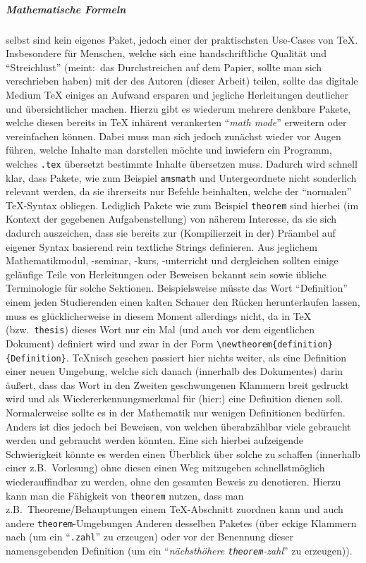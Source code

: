 \subparagraph*{Mathematische Formeln} selbst sind kein eigenes Paket, jedoch einer der praktischsten Use-Cases von \TeX{}. Insbesondere für Menschen, welche sich eine handschriftliche Qualität und \enquote{Streichlust} (meint:\ das Durchstreichen auf dem Papier, sollte man sich verschrieben haben) mit der des Autoren (dieser Arbeit) teilen, sollte das digitale Medium \TeX{} einiges an Aufwand ersparen und jegliche Herleitungen deutlicher und übersichtlicher machen. %
Hierzu gibt es wiederum mehrere denkbare Pakete, welche diesen bereits in \TeX{} inhärent verankerten \enquote{\textit{math mode}} erweitern oder vereinfachen können. Dabei muss man sich jedoch zunächst wieder vor Augen führen, welche Inhalte man darstellen möchte und inwiefern ein Programm, welches \texttt{.tex} übersetzt bestimmte Inhalte übersetzen muss. Dadurch wird schnell klar, dass Pakete, wie zum Beispiel \texttt{amsmath} und Untergeordnete nicht sonderlich relevant werden, da sie ihrerseits nur Befehle beinhalten, welche der \enquote{normalen} \TeX{}-Syntax obliegen. Lediglich Pakete wie zum Beispiel \texttt{theorem} sind hierbei (im Kontext der gegebenen Aufgabenstellung) von näherem Interesse, da sie sich dadurch auszeichen, dass sie bereits zur (Kompilierzeit in der) Präambel auf eigener Syntax basierend rein textliche Strings definieren. Aus jeglichem Mathematikmodul, -seminar, -kurs, -unterricht und dergleichen sollten einige geläufige Teile von Herleitungen oder Beweisen bekannt sein sowie übliche Terminologie für solche Sektionen. Beispielsweise müsste das Wort \enquote{Definition} einem jeden Studierenden einen kalten Schauer den Rücken herunterlaufen lassen, muss es glücklicherweise in diesem Moment allerdings nicht, da in \TeX{} (bzw.\ \texttt{thesis}) dieses Wort nur ein Mal (und auch vor dem eigentlichen Dokument) definiert wird und zwar in der Form \verb|\newtheorem{definition}{Definition}|. \TeX{}nisch gesehen passiert hier nichts weiter, als eine Definition einer neuen Umgebung, welche sich danach (innerhalb des Dokumentes) darin äußert, dass das Wort in den Zweiten geschwungenen Klammern breit gedruckt wird und als Wiedererkennungsmerkmal für (hier:) eine Definition dienen soll. Normalerweise sollte es in der Mathematik nur wenigen Definitionen bedürfen. Anders ist dies jedoch bei Beweisen, von welchen überabzählbar viele gebraucht werden und gebraucht werden könnten. Eine sich hierbei aufzeigende Schwierigkeit könnte es werden einen Überblick über solche zu schaffen (innerhalb einer z.B.\ Vorlesung) ohne diesen einen Weg mitzugeben schnellstmöglich wiederauffindbar zu werden, ohne den gesamten Beweis zu denotieren. Hierzu kann man die Fähigkeit von \texttt{theorem} nutzen, dass man z.B.\ Theoreme/Behauptungen einem \TeX{}-Abschnitt zuordnen kann und auch andere \texttt{theorem}-Umgebungen Anderen desselben Paketes (über eckige Klammern nach (um ein \enquote{\texttt{.zahl}} zu erzeugen) oder vor der Benennung dieser namensgebenden Definition (um ein \enquote{\textit{nächsthöhere \texttt{theorem}-zahl}} zu erzeugen)).%
